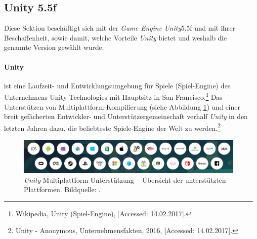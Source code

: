 \subsection{Unity 5.5f}
Diese Sektion beschäftigt sich mit der \textit{Game Engine Unity}5.5f und mit ihrer Beschaffenheit, sowie damit, welche Vorteile \textit{Unity} bietet und weshalb die genannte Version gewählt wurde.\paragraph*{Unity}  \frqq ist eine Laufzeit- und Entwicklungsumgebung für Spiele (Spiel-Engine) des Unternehmens Unity Technologies mit Hauptsitz in San Francisco\flqq.\footnote{ Wikipedia, Unity (Spiel-Engine), [Accessed: 14.02.2017].} Das Unterstützen von Multiplattform-Kompilierung (siehe Abbildung \ref{fig:unity_builds}) und einer breit gefächerten Entwickler- und Unterstützergemeinschaft verhalf \textit{Unity} in den letzten Jahren dazu, die beliebteste Spiele-Engine der Welt zu werden.\footnote{ Unity - Anonymous, Unternehmensfakten, 2016, [Accessed: 14.02.2017].}
\begin{figure}[H]
	\centering
	\includegraphics[width=1.0\textwidth]{figuren/unity_builds}
	\caption{\textit{Unity} Multiplattform-Unterstützung -- Übersicht der unterstützten Plattformen. Bildquelle: \cite{unity}.}
	\label{fig:unity_builds}
\end{figure}
